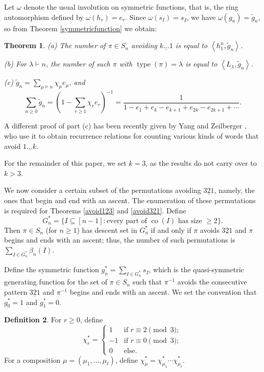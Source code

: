 \documentclass[12pt]{article}
\newcommand{\Perm}{S}
\DeclareMathOperator{\type}{type}
\DeclareMathOperator{\co}{co}
\newcommand{\ee}{\chi}
\newtheorem{thm}{Theorem}[section]
\theoremstyle{definition}
\newtheorem{defn}[thm]{Definition}
\begin{document}
Let $\omega$ denote the usual involution on symmetric functions, that is, the ring automorphism defined by $\omega(h_r) = e_r$. Since $\omega(s_{I}) = s_{\overline{I}}$, we have $\omega(g_n) = \widetilde{g}_n$, so from Theorem \ref{symmetricfunction} we obtain:

\begin{thm} \label{omega} (a) The number of $\pi \in \Perm_n$ avoiding $\underline{k\dots 1}$ is equal to $\left\langle h_1^n, \widetilde{g}_n \right\rangle$.

(b) For $\lambda \vdash n$, the number of such $\pi$ with $\type(\pi) = \lambda$ is equal to $\left\langle L_\lambda, \widetilde{g}_n \right\rangle$.

(c) $\widetilde{g}_n = \sum_{\mu \vDash n} \ee_\mu e_\mu$, and
\[ \sum_{n\ge0} \widetilde{g}_n = \left(1 - \sum_{r\ge1} \ee_r e_r\right)^{-1} = \frac{1}{1 - e_1 + e_k - e_{k+1} + e_{2k} - e_{2k+1} + \cdots}. \tag*{$\square$} \]
\end{thm}

A different proof of part (c) has been recently given by Yang and Zeilberger \cite{YZ}, who use it to obtain recurrence relations for counting various kinds of words that avoid $\underline{1 \ldots k}$.

For the remainder of this paper, we set $k = 3$, as the results do not carry over to $k > 3$.

We now consider a certain subset of the permutations avoiding $\underline{321}$, namely, the ones that begin and end with an ascent. The enumeration of these permutations is required for Theorems \ref{avoid123} and \ref{avoid321}. Define
\[ G_n^* = \{I \subseteq [n-1] \colon \text{every part of $\co(I)$ has size $\ge 2$}\}. \]
Then $\pi \in \Perm_n$ (for $n \ge 1$) has descent set in $G_n^*$ if and only if $\pi$ avoids $\underline{321}$ and $\pi$ begins and ends with an ascent; thus, the number of such permutations is $\sum_{I \in G_n^*} \beta_n(I)$.

Define the symmetric function $g_n^* = \sum_{I \in G_n^*} s_{I}$, which is the quasi-symmetric generating function for the set of $\pi \in \Perm_n$ such that $\pi^{-1}$ avoids the consecutive pattern $\underline{321}$ and $\pi^{-1}$ begins and ends with an ascent. We set the convention that $g_0^* = 1$ and $g_1^* = 0$.

\begin{defn} \label{defee2} For $r \ge 0$, define
\[ \ee_r^* = \begin{cases} 1 & \text{if $r \equiv 2 \pmod{3}$}; \\
-1 & \text{if $r \equiv 0 \pmod{3}$}; \\
0 & \text{else}. \end{cases} \]
For a composition $\mu = (\mu_1, \ldots, \mu_t)$, define $\ee_\mu^* = \ee_{\mu_1}^* \cdots \ee_{\mu_t}^*$.
\end{defn}
\end{document}
